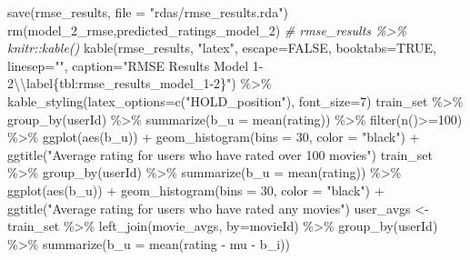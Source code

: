 \documentclass[
]{article}
\newenvironment{Shaded}{}{}
\newcommand{\AttributeTok}[1]{\textcolor[rgb]{0.49,0.56,0.16}{#1}}
\newcommand{\CommentTok}[1]{\textcolor[rgb]{0.38,0.63,0.69}{\textit{#1}}}
\newcommand{\ConstantTok}[1]{\textcolor[rgb]{0.53,0.00,0.00}{#1}}
\newcommand{\DecValTok}[1]{\textcolor[rgb]{0.25,0.63,0.44}{#1}}
\newcommand{\FunctionTok}[1]{\textcolor[rgb]{0.02,0.16,0.49}{#1}}
\newcommand{\NormalTok}[1]{#1}
\newcommand{\OtherTok}[1]{\textcolor[rgb]{0.00,0.44,0.13}{#1}}
\newcommand{\SpecialCharTok}[1]{\textcolor[rgb]{0.25,0.44,0.63}{#1}}
\newcommand{\StringTok}[1]{\textcolor[rgb]{0.25,0.44,0.63}{#1}}
\begin{document}
\begin{Shaded}
\begin{Highlighting}[]
\FunctionTok{save}\NormalTok{(rmse\_results, }\AttributeTok{file =} \StringTok{"rdas/rmse\_results.rda"}\NormalTok{)}
\FunctionTok{rm}\NormalTok{(model\_2\_rmse,predicted\_ratings\_model\_2)}
\CommentTok{\# rmse\_results \%\textgreater{}\% knitr::kable()}
  \FunctionTok{kable}\NormalTok{(rmse\_results, }\StringTok{"latex"}\NormalTok{, }\AttributeTok{escape=}\ConstantTok{FALSE}\NormalTok{, }\AttributeTok{booktabs=}\ConstantTok{TRUE}\NormalTok{, }\AttributeTok{linesep=}\StringTok{""}\NormalTok{, }\AttributeTok{caption=}\StringTok{"RMSE Results Model 1{-}2}\SpecialCharTok{\textbackslash{}\textbackslash{}}\StringTok{label\{tbl:rmse\_results\_model\_1{-}2\}"}\NormalTok{) }\SpecialCharTok{\%\textgreater{}\%}
    \FunctionTok{kable\_styling}\NormalTok{(}\AttributeTok{latex\_options=}\FunctionTok{c}\NormalTok{(}\StringTok{"HOLD\_position"}\NormalTok{), }\AttributeTok{font\_size=}\DecValTok{7}\NormalTok{)}
\NormalTok{train\_set }\SpecialCharTok{\%\textgreater{}\%} 
  \FunctionTok{group\_by}\NormalTok{(userId) }\SpecialCharTok{\%\textgreater{}\%} 
  \FunctionTok{summarize}\NormalTok{(}\AttributeTok{b\_u =} \FunctionTok{mean}\NormalTok{(rating)) }\SpecialCharTok{\%\textgreater{}\%} 
  \FunctionTok{filter}\NormalTok{(}\FunctionTok{n}\NormalTok{()}\SpecialCharTok{\textgreater{}=}\DecValTok{100}\NormalTok{) }\SpecialCharTok{\%\textgreater{}\%}
  \FunctionTok{ggplot}\NormalTok{(}\FunctionTok{aes}\NormalTok{(b\_u)) }\SpecialCharTok{+} 
  \FunctionTok{geom\_histogram}\NormalTok{(}\AttributeTok{bins =} \DecValTok{30}\NormalTok{, }\AttributeTok{color =} \StringTok{"black"}\NormalTok{) }\SpecialCharTok{+} 
  \FunctionTok{ggtitle}\NormalTok{(}\StringTok{"Average rating for users who have rated over 100 movies"}\NormalTok{)}
\NormalTok{train\_set }\SpecialCharTok{\%\textgreater{}\%} 
  \FunctionTok{group\_by}\NormalTok{(userId) }\SpecialCharTok{\%\textgreater{}\%} 
  \FunctionTok{summarize}\NormalTok{(}\AttributeTok{b\_u =} \FunctionTok{mean}\NormalTok{(rating)) }\SpecialCharTok{\%\textgreater{}\%} 
  \FunctionTok{ggplot}\NormalTok{(}\FunctionTok{aes}\NormalTok{(b\_u)) }\SpecialCharTok{+} 
  \FunctionTok{geom\_histogram}\NormalTok{(}\AttributeTok{bins =} \DecValTok{30}\NormalTok{, }\AttributeTok{color =} \StringTok{"black"}\NormalTok{) }\SpecialCharTok{+} 
  \FunctionTok{ggtitle}\NormalTok{(}\StringTok{"Average rating for users who have rated any movies"}\NormalTok{)}
\NormalTok{user\_avgs }\OtherTok{\textless{}{-}}\NormalTok{ train\_set }\SpecialCharTok{\%\textgreater{}\%} 
  \FunctionTok{left\_join}\NormalTok{(movie\_avgs, }\AttributeTok{by=}\StringTok{\textquotesingle{}movieId\textquotesingle{}}\NormalTok{) }\SpecialCharTok{\%\textgreater{}\%}
  \FunctionTok{group\_by}\NormalTok{(userId) }\SpecialCharTok{\%\textgreater{}\%}
  \FunctionTok{summarize}\NormalTok{(}\AttributeTok{b\_u =} \FunctionTok{mean}\NormalTok{(rating }\SpecialCharTok{{-}}\NormalTok{ mu }\SpecialCharTok{{-}}\NormalTok{ b\_i))}


\end{Highlighting}
\end{Shaded}
\end{document}
